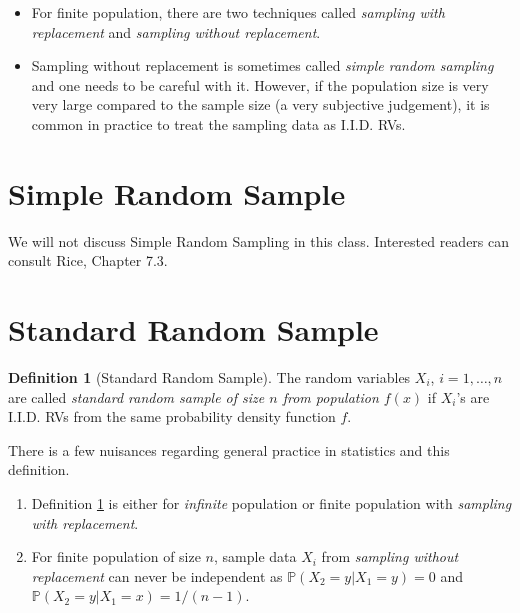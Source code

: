\documentclass[
  openany]{book}
\theoremstyle{definition}
\newtheorem{definition}{Definition}[chapter]
\theoremstyle{definition}
\theoremstyle{definition}
\theoremstyle{definition}
\theoremstyle{remark}
\begin{document}
\begin{itemize}
\item
  For finite population, there are two techniques called \emph{sampling with replacement} and
  \emph{sampling without replacement}.
\item
  Sampling without replacement is sometimes called \emph{simple random sampling} and
  one needs to be careful with it. However, if the population size is very very large
  compared to the sample size (a very subjective judgement),
  it is common in practice to treat the sampling data as I.I.D. RVs.
\end{itemize}

\hypertarget{simple-random-sample}{%
\section{Simple Random Sample}\label{simple-random-sample}}

We will not discuss Simple Random Sampling in this class.
Interested readers can consult Rice, Chapter 7.3.

\hypertarget{standard-random-sample}{%
\section{Standard Random Sample}\label{standard-random-sample}}

\begin{definition}[Standard Random Sample]
\protect\hypertarget{def:stdSample}{}\label{def:stdSample}The random variables \(X_i\), \(i = 1,\dots , n\) are called \emph{standard random sample of
size \(n\) from population \(f(x)\)} if \(X_i\)'s are I.I.D. RVs from the same
probability density function \(f\).
\end{definition}

There is a few nuisances regarding general practice in statistics and this definition.

\begin{enumerate}
\def\labelenumi{\arabic{enumi}.}
\item
  Definition \ref{def:stdSample} is either for \emph{infinite} population or finite population with \emph{sampling with replacement}.
\item
  For finite population of size \(n\), sample data \(X_i\) from \emph{sampling without replacement}
  can never be independent as
  \(\mathbb{P}(X_2 = y | X_1 = y) = 0\) and \(\mathbb{P}(X_2 = y | X_1 = x) = 1/(n-1)\).
\end{enumerate}
\end{document}
